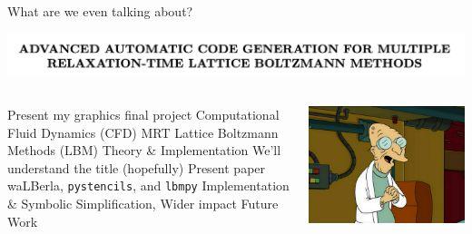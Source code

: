 \begin{frame}{What are we even talking about?}
  \begin{center}
    \includegraphics[width=0.8\linewidth]{title_header.png}
  \end{center}
  \begin{columns}
  \begin{outline}
    \1 Present my graphics final project
    \2 Computational Fluid Dynamics (CFD)
    \2 MRT Lattice Boltzmann Methods (LBM)
    \2 Theory \& Implementation
    \2 We'll understand the title (hopefully) 
    \1 Present paper
      \2 waLBerla, \lstinline{pystencils}, and \lstinline{lbmpy}
      \2 Implementation \& Symbolic Simplification, 
      \2 Wider impact
    \1 Future Work
  \end{outline}

  \centering
  \begin{center}
    \includegraphics[width=\linewidth]{professor.png}
  \end{center}
  \end{columns}
\end{frame}
